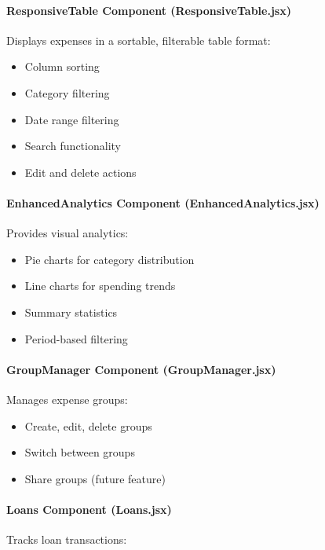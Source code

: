 \paragraph{ResponsiveTable Component (ResponsiveTable.jsx)}

Displays expenses in a sortable, filterable table format:

\begin{itemize}
    \item Column sorting
    \item Category filtering
    \item Date range filtering
    \item Search functionality
    \item Edit and delete actions
\end{itemize}

\paragraph{EnhancedAnalytics Component (EnhancedAnalytics.jsx)}

Provides visual analytics:

\begin{itemize}
    \item Pie charts for category distribution
    \item Line charts for spending trends
    \item Summary statistics
    \item Period-based filtering
\end{itemize}

\paragraph{GroupManager Component (GroupManager.jsx)}

Manages expense groups:

\begin{itemize}
    \item Create, edit, delete groups
    \item Switch between groups
    \item Share groups (future feature)
\end{itemize}

\paragraph{Loans Component (Loans.jsx)}

Tracks loan transactions:


